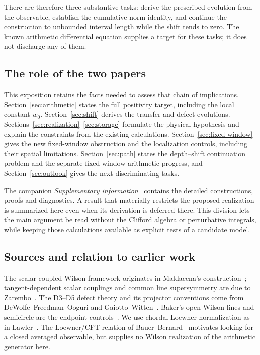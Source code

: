 There are therefore three substantive tasks: derive the prescribed
evolution from the observable, establish the cumulative norm
identity, and continue the construction to unbounded interval
length while the shift tends to zero. The known arithmetic
differential equation supplies a target for these tasks; it does
not discharge any of them.

\subsection{The role of the two papers}

This exposition retains the facts needed to assess that chain of
implications. Section~\ref{sec:arithmetic} states the full positivity
target, including the local constant $w_0$.
Section~\ref{sec:shift} derives the transfer and defect evolutions.
Sections~\ref{sec:realization}--\ref{sec:storage} formulate the
physical hypothesis and explain the constraints from the existing
calculations. Section~\ref{sec:fixed-window} gives the new fixed-window obstruction
and the localization controls, including their spatial limitations.
Section~\ref{sec:path} states the depth--shift continuation problem and
the separate fixed-window arithmetic progress, and Section~\ref{sec:outlook} gives the next
discriminating tasks.

The companion \emph{Supplementary information}~\cite{Supplement}
contains the detailed constructions, proofs and diagnostics.
A result that materially restricts the proposed realization is
summarized here even when its derivation is deferred there.
This division lets the main argument be read without the Clifford
algebra or perturbative integrals, while keeping those calculations
available as explicit tests of a candidate model.

\subsection{Sources and relation to earlier work}

The scalar-coupled Wilson framework originates in
Maldacena's construction~\cite{Maldacena}; tangent-dependent scalar
couplings and common line supersymmetry are due to
Zarembo~\cite{Zarembo}. The D3--D5 defect theory and its projector
conventions come from DeWolfe--Freedman--Ooguri and
Gaiotto--Witten~\cite{DFO,GW}. Baker's open Wilson lines and
semicircle are the endpoint controls~\cite{Baker}.
We use chordal Loewner normalization as in Lawler~\cite{Lawler}.
The Loewner/CFT relation of Bauer--Bernard~\cite{BauerBernard}
motivates looking for a closed averaged observable, but supplies
no Wilson realization of the arithmetic generator here.

